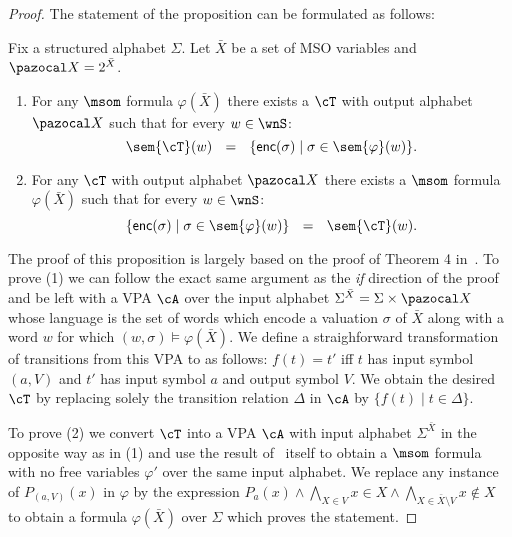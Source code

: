 \begin{proof}
	The statement of the proposition can be formulated as follows:
	\begin{proposition}
		Fix a structured alphabet $\Sigma$. Let $\bar{X}$ be a set of MSO variables and ${\pazocal X} = 2^{\bar{X}}$. 
		\begin{enumerate}
			\item For any $\msom$ formula $\varphi(\bar{X})$ there exists a \vpann $\cT$ with output alphabet ${\pazocal X}$ such that for every $w\in \wnS$:
			$$
			\sem{\cT}(w) \ \ = \ \ \{\textsf{enc}(\sigma)\mid \sigma\in\sem{\varphi}(w)\}.
			$$
			\item For any \vpann $\cT$ with output alphabet ${\pazocal X}$ there exists a  $\msom$ formula $\varphi(\bar{X})$ such that for every $w\in \wnS$:
			$$
			\{\textsf{enc}(\sigma)\mid \sigma\in\sem{\varphi}(w)\} \ \ = \ \  \sem{\cT}(w).
			$$
		\end{enumerate}
	\end{proposition}
	
	The proof of this proposition is largely based on the proof of Theorem 4 in~\cite{AlurM04}.
	To prove (1) we can follow the exact same argument as the {\em if} direction of the proof and be left with a VPA $\cA$ over the input alphabet $\Sigma^{\bar{X}} = \Sigma \times {\pazocal X}$ whose language is the set of words which encode a valuation $\sigma$ of $\bar{X}$ along with a word $w$ for which $(w, \sigma)\models\varphi(\bar{X})$. 
	We define a straighforward transformation of transitions from this VPA to \vpann as follows: $f(t) = t'$ iff $t$ has input symbol $(a, V)$ and $t'$ has input symbol $a$ and output symbol $V$.
	We obtain the desired \vpann $\cT$ by replacing solely the transition relation $\Delta$ in $\cA$ by $\{f(t)\mid t\in\Delta\}$.
	
	To prove (2) we convert $\cT$ into a VPA $\cA$ with input alphabet $\Sigma^{\bar{X}}$ in the opposite way as in (1) and use the result of~\cite{AlurM04} itself to obtain a $\msom$ formula with no free variables $\varphi'$ over the same input alphabet. We replace any instance of $P_{(a, V)}(x)$ in $\varphi$ by the expression $P_a(x) \wedge \bigwedge_{X\in V}x\in X\wedge \bigwedge_{X\in\bar{X}\setminus V}x\not\in X$ to obtain a formula $\varphi(\bar{X})$ over $\Sigma$ which proves the statement.
	
\end{proof}
